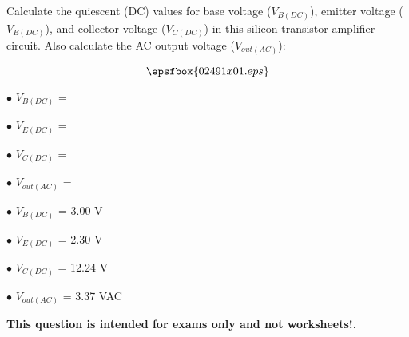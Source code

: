 

Calculate the quiescent (DC) values for base voltage ($V_{B(DC)}$), emitter voltage ($V_{E(DC)}$), and collector voltage ($V_{C(DC)}$) in this silicon transistor amplifier circuit.  Also calculate the AC output voltage ($V_{out(AC)}$):

$$\epsfbox{02491x01.eps}$$

\medskip
\item{$\bullet$} $V_{B(DC)}$ = 
\item{$\bullet$} $V_{E(DC)}$ = 
\item{$\bullet$} $V_{C(DC)}$ = 
\item{$\bullet$} $V_{out(AC)}$ = 
\medskip







\medskip
\goodbreak
\item{$\bullet$} $V_{B(DC)}$ = 3.00 V
\item{$\bullet$} $V_{E(DC)}$ = 2.30 V
\item{$\bullet$} $V_{C(DC)}$ = 12.24 V
\item{$\bullet$} $V_{out(AC)}$ = 3.37 VAC
\medskip







{\bf This question is intended for exams only and not worksheets!}.




